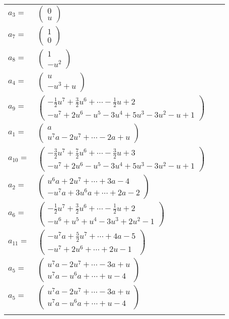\documentclass[1p]{elsarticle_modified}
\theoremstyle{definition}
\begin{document}
\begin{tabular}{m{7pt} m{180pt} m{7pt} m{180pt} }
\flushright $a_{3}=$&$\begin{pmatrix}0\\u\end{pmatrix}$ \\
\flushright $a_{7}=$&$\begin{pmatrix}1\\0\end{pmatrix}$ \\
\flushright $a_{8}=$&$\begin{pmatrix}1\\- u^2\end{pmatrix}$ \\
\flushright $a_{4}=$&$\begin{pmatrix}u\\- u^3+u\end{pmatrix}$ \\
\flushright $a_{9}=$&$\begin{pmatrix}-\frac{1}{2} u^7+\frac{3}{2} u^6+\cdots-\frac{1}{2} u+2\\- u^7+2 u^6- u^5-3 u^4+5 u^3-3 u^2- u+1\end{pmatrix}$ \\
\flushright $a_{1}=$&$\begin{pmatrix}a\\u^7 a-2 u^7+\cdots-2 a+u\end{pmatrix}$ \\
\flushright $a_{10}=$&$\begin{pmatrix}-\frac{3}{2} u^7+\frac{7}{2} u^6+\cdots-\frac{3}{2} u+3\\- u^7+2 u^6- u^5-3 u^4+5 u^3-3 u^2- u+1\end{pmatrix}$ \\
\flushright $a_{2}=$&$\begin{pmatrix}u^6 a+2 u^7+\cdots+3 a-4\\- u^7 a+3 u^6 a+\cdots+2 a-2\end{pmatrix}$ \\
\flushright $a_{6}=$&$\begin{pmatrix}-\frac{1}{2} u^7+\frac{3}{2} u^6+\cdots-\frac{1}{2} u+2\\- u^6+u^5+u^4-3 u^3+2 u^2-1\end{pmatrix}$ \\
\flushright $a_{11}=$&$\begin{pmatrix}- u^7 a+\frac{5}{2} u^7+\cdots+4 a-5\\- u^7+2 u^6+\cdots+2 u-1\end{pmatrix}$ \\
\flushright $a_{5}=$&$\begin{pmatrix}u^7 a-2 u^7+\cdots-3 a+u\\u^7 a- u^6 a+\cdots+u-4\end{pmatrix}$\\ \flushright $a_{5}=$&$\begin{pmatrix}u^7 a-2 u^7+\cdots-3 a+u\\u^7 a- u^6 a+\cdots+u-4\end{pmatrix}$\\&\end{tabular}
\end{document}
